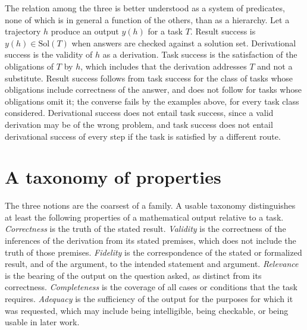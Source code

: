 The relation among the three is better understood as a system of predicates, none of which is in general a function of the others, than as a hierarchy. Let a trajectory $h$ produce an output $y(h)$ for a task $T$. Result success is $y(h) \in \mathrm{Sol}(T)$ when answers are checked against a solution set. Derivational success is the validity of $h$ as a derivation. Task success is the satisfaction of the obligations of $T$ by $h$, which includes that the derivation addresses $T$ and not a substitute. Result success follows from task success for the class of tasks whose obligations include correctness of the answer, and does not follow for tasks whose obligations omit it; the converse fails by the examples above, for every task class considered. Derivational success does not entail task success, since a valid derivation may be of the wrong problem, and task success does not entail derivational success of every step if the task is satisfied by a different route.

\section{A taxonomy of properties}

The three notions are the coarsest of a family. A usable taxonomy distinguishes at least the following properties of a mathematical output relative to a task. \emph{Correctness} is the truth of the stated result. \emph{Validity} is the correctness of the inferences of the derivation from its stated premises, which does not include the truth of those premises. \emph{Fidelity} is the correspondence of the stated or formalized result, and of the argument, to the intended statement and argument. \emph{Relevance} is the bearing of the output on the question asked, as distinct from its correctness. \emph{Completeness} is the coverage of all cases or conditions that the task requires. \emph{Adequacy} is the sufficiency of the output for the purposes for which it was requested, which may include being intelligible, being checkable, or being usable in later work.

